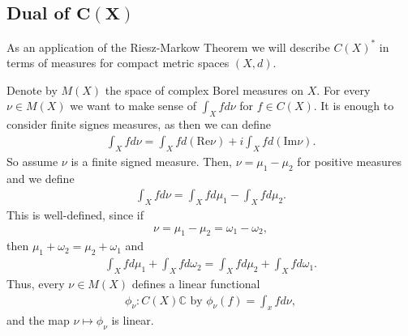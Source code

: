 \subsection*{Dual of \(\boldsymbol{C(X)}\)}
As an application of the Riesz-Markow Theorem we will describe \(C(X)^*\) in terms of measures for compact metric spaces \((X,d)\).

Denote by \(M(X)\) the space of complex Borel measures on \(X\). For every \(\nu\in M(X)\) we want to make sense of \(\int_Xfd\nu\) for \(f\in C(X)\). It is enough to consider finite signes measures, as then we can define
\begin{align*}
    \int_Xfd\nu = \int_Xfd(\text{Re}\nu) + i\int_X fd(\text{Im}\nu).
\end{align*}
So assume \(\nu\) is a finite signed measure. Then, \(\nu=\mu_1 - \mu_2\) for positive measures and we define
\begin{align*}
    \int_Xfd\nu = \int_X fd\mu_1 - \int_Xfd\mu_2.
\end{align*}
This is well-defined, since if
\begin{align*}
    \nu=\mu_1-\mu_2 = \omega_1-\omega_2,
\end{align*}
then \(\mu_1 + \omega_2 = \mu_2 + \omega_1\) and
\begin{align*}
    \int_Xfd\mu_1 + \int_Xfd\omega_2 = \int_Xfd\mu_2 + \int_Xfd\omega_1.
\end{align*}
Thus, every \(\nu\in M(X)\) defines a linear functional
\begin{align*}
    \phi_{\nu} : C(X) \mathbb{C} \text{ by }\phi_{\nu}(f) = \int_xfd\nu,
\end{align*}
and the map \(\nu\mapsto\phi_{\nu}\) is linear.

